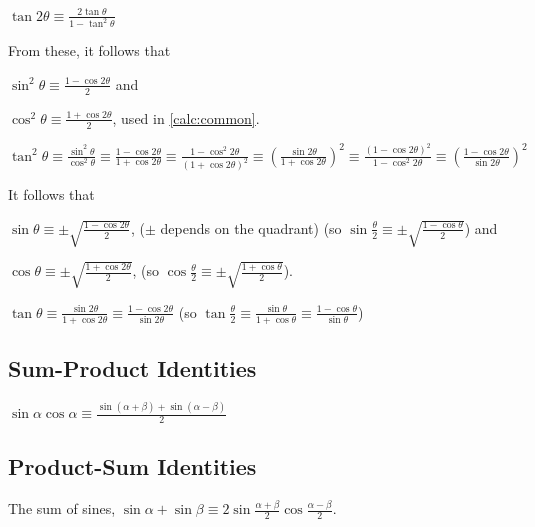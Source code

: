 \documentclass[a4paper,11pt]{article}
\begin{document}
    $\displaystyle \tan 2\theta \equiv
        \frac{2\tan \theta}{1 - \tan^2 \theta}$

    From these, it follows that

    $\displaystyle \sin^2 \theta \equiv
        \frac{1 - \cos 2 \theta} 2$ and

    $\displaystyle \cos^2 \theta \equiv
        \frac{1 + \cos 2 \theta} 2$, used in \ref{calc:common}.

    $\displaystyle \tan^2 \theta \equiv \frac{\sin^2 \theta}{\cos^2 \theta}
        \equiv \frac{1 - \cos 2 \theta}{1 + \cos 2 \theta}
        \equiv \frac{1 - \cos^2 2 \theta}{(1 + \cos 2 \theta)^2}
        \equiv \left(\frac{\sin 2 \theta}{1 + \cos 2 \theta}\right)^2
        \equiv \frac{(1 - \cos 2 \theta)^2}{1 - \cos^2 2 \theta}
        \equiv \left(\frac{1 - \cos 2 \theta}{\sin 2 \theta}\right)^2$

    It follows that

    $\displaystyle \sin \theta \equiv
        \pm\sqrt{\frac{1 - \cos 2 \theta} 2}$, ($\pm$ depends on the quadrant)
    (so $\displaystyle \sin \frac \theta 2 \equiv
        \pm\sqrt{\frac{1 - \cos \theta} 2}$) and

    $\displaystyle \cos \theta \equiv
        \pm\sqrt{\frac{1 + \cos 2 \theta} 2}$, (so
    $\displaystyle \cos \frac \theta 2 \equiv
        \pm\sqrt{\frac{1 + \cos \theta} 2}$).

    $\displaystyle \tan \theta
        \equiv \frac{\sin 2 \theta}{1 + \cos 2 \theta}
        \equiv \frac{1 - \cos 2 \theta}{\sin 2 \theta}$
    (so $\displaystyle \tan \frac \theta 2
        \equiv \frac{\sin \theta}{1 + \cos \theta}
        \equiv \frac{1 - \cos \theta}{\sin \theta}$)

    \subsection{Sum-Product Identities}

    $\displaystyle \sin \alpha \cos \alpha \equiv
        \frac{\sin(\alpha + \beta) + \sin(\alpha - \beta)} 2$

    \subsection{Product-Sum Identities}


    The sum of sines, $\displaystyle \boxed{\sin \alpha + \sin \beta \equiv
        2 \sin \frac{\alpha + \beta}2 \cos \frac{\alpha - \beta}2}$.
\end{document}
